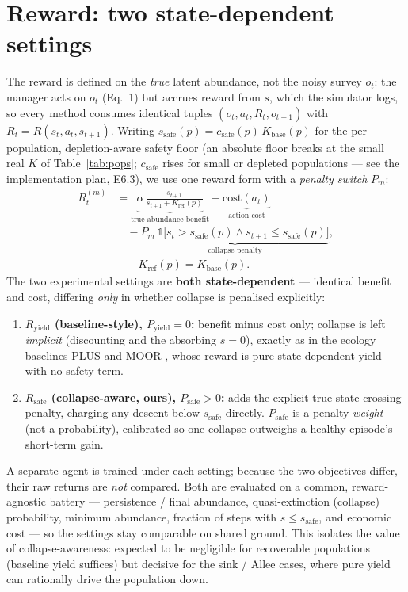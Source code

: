\documentclass[11pt]{article}
\newcommand{\Kbase}{K_{\mathrm{base}}}
\newcommand{\Kref}{K_{\mathrm{ref}}}
\newcommand{\ssafe}{s_{\mathrm{safe}}}
\begin{document}
\section{Reward: two state-dependent settings}
\label{sec:reward}
The reward is defined on the \emph{true} latent abundance, not the noisy survey
$o_t$: the manager acts on $o_t$ (Eq.~1) but accrues reward from $s$, which the
simulator logs, so every method consumes identical tuples $(o_t,a_t,R_t,o_{t+1})$
with $R_t=R(s_t,a_t,s_{t+1})$. Writing $\ssafe(p)=c_{\mathrm{safe}}(p)\,\Kbase(p)$ for
the per-population, depletion-aware safety floor (an absolute floor breaks at the small
real $K$ of Table~\ref{tab:pops}; $c_{\mathrm{safe}}$ rises for small or depleted
populations --- see the implementation plan, E6.3), we use one reward form with a
\emph{penalty switch} $P_m$:
\begin{equation}
\begin{aligned}
R^{(m)}_t
&=
\underbrace{\alpha\,\frac{s_{t+1}}{s_{t+1}+\Kref(p)}}_{\text{true-abundance benefit}}
-\underbrace{\mathrm{cost}(a_t)}_{\text{action cost}}\\
&\quad
-\underbrace{P_m\,\mathbb{1}\!\big[
s_t>\ssafe(p)\wedge s_{t+1}\le\ssafe(p)
\big]}_{\text{collapse penalty}},\\
&\qquad \Kref(p)=\Kbase(p).
\end{aligned}
\label{eq:reward}
\end{equation}
The two experimental settings are \textbf{both state-dependent} --- identical benefit
and cost, differing \emph{only} in whether collapse is penalised explicitly:
\begin{enumerate}[leftmargin=1.6em,nosep]
\item \textbf{$R_{\mathrm{yield}}$ (baseline-style), $P_{\mathrm{yield}}{=}0$:} benefit
minus cost only; collapse is left \emph{implicit} (discounting and the absorbing
$s{=}0$), exactly as in the ecology baselines PLUS \cite{memarzadeh2018} and MOOR
\cite{ju2025}, whose reward is pure state-dependent yield with no safety term.
\item \textbf{$R_{\mathrm{safe}}$ (collapse-aware, ours), $P_{\mathrm{safe}}{>}0$:} adds
the explicit true-state crossing penalty, charging any descent below $\ssafe$ directly.
$P_{\mathrm{safe}}$ is a penalty \emph{weight} (not a probability), calibrated so one
collapse outweighs a healthy episode's short-term gain.
\end{enumerate}
A separate agent is trained under each setting; because the two objectives differ,
their raw returns are \emph{not} compared. Both are evaluated on a common,
reward-agnostic battery --- persistence / final abundance, quasi-extinction (collapse)
probability, minimum abundance, fraction of steps with $s\le\ssafe$, and economic cost
--- so the settings stay comparable on shared ground. This isolates the value of
collapse-awareness: expected to be negligible for recoverable populations (baseline
yield suffices) but decisive for the sink / Allee cases, where pure yield can rationally
drive the population down.
\end{document}

